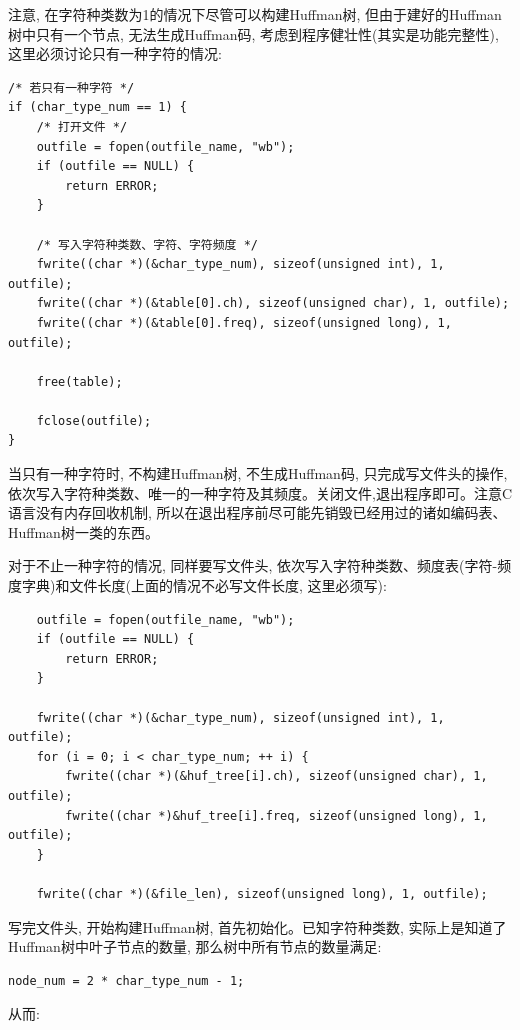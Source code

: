 \documentclass{ctexart}
\begin{document}
注意, 在字符种类数为1的情况下尽管可以构建Huffman树, 但由于建好的Huffman树中只有一个节点, 无法生成Huffman码, 考虑到程序健壮性(其实是功能完整性), 这里必须讨论只有一种字符的情况:

{\setmainfont{Courier New Bold}              
\begin{lstlisting}
/* 若只有一种字符 */
if (char_type_num == 1) {
    /* 打开文件 */
    outfile = fopen(outfile_name, "wb");
    if (outfile == NULL) {
        return ERROR;
    }

    /* 写入字符种类数、字符、字符频度 */
    fwrite((char *)(&char_type_num), sizeof(unsigned int), 1, outfile);
    fwrite((char *)(&table[0].ch), sizeof(unsigned char), 1, outfile);
    fwrite((char *)(&table[0].freq), sizeof(unsigned long), 1, outfile);

    free(table);

    fclose(outfile);
}
\end{lstlisting}}

当只有一种字符时, 不构建Huffman树, 不生成Huffman码, 只完成写文件头的操作, 依次写入字符种类数、唯一的一种字符及其频度。关闭文件,退出程序即可。注意C语言没有内存回收机制, 所以在退出程序前尽可能先销毁已经用过的诸如编码表、Huffman树一类的东西。

对于不止一种字符的情况, 同样要写文件头, 依次写入字符种类数、频度表(字符-频度字典)和文件长度(上面的情况不必写文件长度, 这里必须写):

{\setmainfont{Courier New Bold}              
\begin{lstlisting}
    outfile = fopen(outfile_name, "wb");
    if (outfile == NULL) {
        return ERROR;
    }

    fwrite((char *)(&char_type_num), sizeof(unsigned int), 1, outfile);
    for (i = 0; i < char_type_num; ++ i) {
        fwrite((char *)(&huf_tree[i].ch), sizeof(unsigned char), 1, outfile);
        fwrite((char *)&huf_tree[i].freq, sizeof(unsigned long), 1, outfile);
    }

    fwrite((char *)(&file_len), sizeof(unsigned long), 1, outfile);
\end{lstlisting}}

写完文件头, 开始构建Huffman树, 首先初始化。已知字符种类数, 实际上是知道了Huffman树中叶子节点的数量, 那么树中所有节点的数量满足:

{\setmainfont{Courier New Bold}              
\begin{lstlisting}
node_num = 2 * char_type_num - 1;
\end{lstlisting}}

从而:
\end{document}
